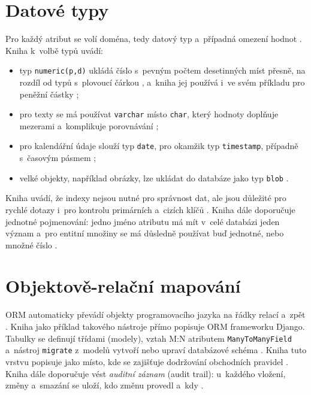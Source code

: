 \section{Datové typy}\label{sec:principy-typy}

Pro každý atribut se volí doména, tedy datový typ a~případná omezení hodnot \cite[s.~68]{Silberschatz2020}. Kniha k~volbě typů uvádí:
\begin{itemize}
\item typ \texttt{numeric(p,d)} ukládá číslo s~pevným počtem desetinných míst přesně, na rozdíl od typů s~plovoucí čárkou \cite[s.~67]{Silberschatz2020}, a~kniha jej používá i~ve svém příkladu pro peněžní částky \cite[s.~68]{Silberschatz2020};
\item pro texty se má používat \texttt{varchar} místo \texttt{char}, který hodnoty doplňuje mezerami a~komplikuje porovnávání \cite[s.~67--68]{Silberschatz2020};
\item pro kalendářní údaje slouží typ \texttt{date}, pro okamžik typ \texttt{timestamp}, případně s~časovým pásmem \cite[s.~154]{Silberschatz2020};
\item velké objekty, například obrázky, lze ukládat do databáze jako typ \texttt{blob} \cite[s.~156]{Silberschatz2020}.
\end{itemize}

Kniha uvádí, že indexy nejsou nutné pro správnost dat, ale jsou důležité pro rychlé dotazy i~pro kontrolu primárních a~cizích klíčů \cite[s.~164]{Silberschatz2020}. Kniha dále doporučuje jednotné pojmenování: jedno jméno atributu má mít v~celé databázi jeden význam a~pro entitní množiny se má důsledně používat buď jednotné, nebo množné číslo \cite[s.~345--346]{Silberschatz2020}.

\section{Objektově-relační mapování}\label{sec:principy-orm}

ORM automaticky převádí objekty programovacího jazyka na řádky relací a~zpět \cite[s.~431]{Silberschatz2020}. Kniha jako příklad takového nástroje přímo popisuje ORM frameworku Django. Tabulky se definují třídami (modely), vztah M:N atributem \texttt{ManyToManyField} a~nástroj \texttt{migrate} z~modelů vytvoří nebo upraví databázové schéma \cite[s.~433--434]{Silberschatz2020}. Kniha tuto vrstvu popisuje jako místo, kde se zajišťuje dodržování obchodních pravidel \cite[s.~431]{Silberschatz2020}. Kniha dále doporučuje vést \emph{auditní záznam} (audit trail): u~každého vložení, změny a~smazání se uloží, kdo změnu provedl a~kdy \cite[s.~445]{Silberschatz2020}.

